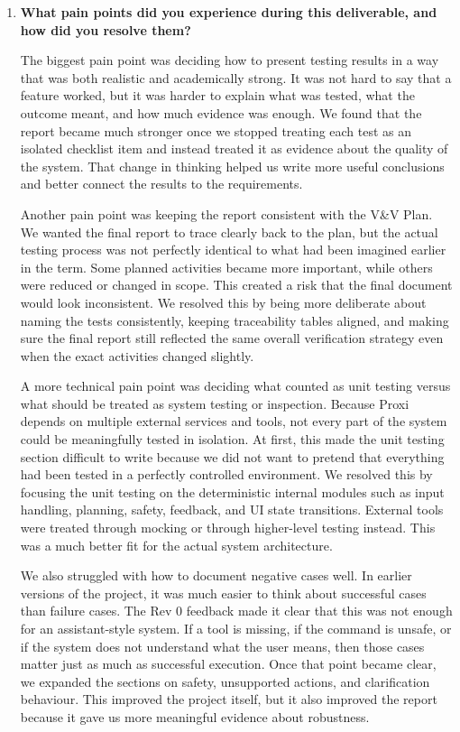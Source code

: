\documentclass[12pt]{article}
\begin{document}
\begin{enumerate}
\bigskip
\item \textbf{What pain points did you experience during this
deliverable, and how did you resolve them?}

The biggest pain point was deciding how to present testing results in a
way that was both realistic and academically strong. It was not hard to
say that a feature worked, but it was harder to explain what was tested,
what the outcome meant, and how much evidence was enough. We found that
the report became much stronger once we stopped treating each test as an
isolated checklist item and instead treated it as evidence about the
quality of the system. That change in thinking helped us write more
useful conclusions and better connect the results to the requirements.

Another pain point was keeping the report consistent with the V\&V
Plan. We wanted the final report to trace clearly back to the plan, but
the actual testing process was not perfectly identical to what had been
imagined earlier in the term. Some planned activities became more
important, while others were reduced or changed in scope. This created a
risk that the final document would look inconsistent. We resolved this
by being more deliberate about naming the tests consistently, keeping
traceability tables aligned, and making sure the final report still
reflected the same overall verification strategy even when the exact
activities changed slightly.

A more technical pain point was deciding what counted as unit testing
versus what should be treated as system testing or inspection. Because
Proxi depends on multiple external services and tools, not every part of
the system could be meaningfully tested in isolation. At first, this
made the unit testing section difficult to write because we did not want
to pretend that everything had been tested in a perfectly controlled
environment. We resolved this by focusing the unit testing on the
deterministic internal modules such as input handling, planning, safety,
feedback, and UI state transitions. External tools were treated through
mocking or through higher-level testing instead. This was a much better
fit for the actual system architecture.

We also struggled with how to document negative cases well. In earlier
versions of the project, it was much easier to think about successful
cases than failure cases. The Rev 0 feedback made it clear that this was
not enough for an assistant-style system. If a tool is missing, if the
command is unsafe, or if the system does not understand what the user
means, then those cases matter just as much as successful execution.
Once that point became clear, we expanded the sections on safety,
unsupported actions, and clarification behaviour. This improved the
project itself, but it also improved the report because it gave us more
meaningful evidence about robustness.


\end{enumerate}
\end{document}
